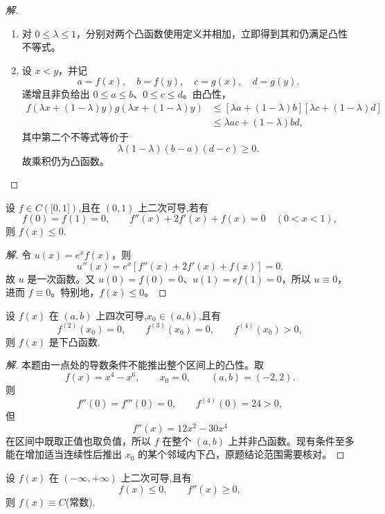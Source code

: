 \documentclass[../../数学分析培优讲义(答案版).tex]{subfiles}
\begin{document}
\begin{proof}[解]
\begin{enumerate}[label=(\arabic*)]
    \item 对 $0\leq\lambda\leq1$，分别对两个凸函数使用定义并相加，立即得到其和仍满足凸性不等式。

    \item 设 $x<y$，并记
    \[
        a=f(x),\quad b=f(y),\quad c=g(x),\quad d=g(y).
    \]
    递增且非负给出 $0\leq a\leq b$、$0\leq c\leq d$。由凸性，
    \[
    \begin{aligned}
        f(\lambda x+(1-\lambda)y)
        g(\lambda x+(1-\lambda)y)
        &\leq[\lambda a+(1-\lambda)b]
        [\lambda c+(1-\lambda)d]\\
        &\leq\lambda ac+(1-\lambda)bd,
    \end{aligned}
    \]
    其中第二个不等式等价于
    \[
        \lambda(1-\lambda)(b-a)(d-c)\geq0.
    \]
    故乘积仍为凸函数。
\end{enumerate}
\end{proof}

\begin{example}
设 $f\in C(\lbrack 0,1\rbrack)$,且在 $(0,1)$ 上二次可导,若有
\[
    f(0)=f(1)=0,
    \qquad f''(x)+2f'(x)+f(x)=0\quad(0<x<1),
\]
则 $f(x)\leq0$.
\end{example}

\begin{proof}[解]
令 $u(x)=e^x f(x)$，则
\[
    u''(x)=e^x[f''(x)+2f'(x)+f(x)]=0.
\]
故 $u$ 是一次函数。又 $u(0)=f(0)=0$、$u(1)=ef(1)=0$，所以 $u\equiv0$，进而 $f\equiv0$。特别地，$f(x)\leq0$。
\end{proof}

\begin{example}
设 $f(x)$ 在 $(a,b)$ 上四次可导,$x_0\in(a,b)$,且有
\[
    f^{(2)}(x_0)=0,
    \qquad f^{(3)}(x_0)=0,
    \qquad f^{(4)}(x_0)>0,
\]
则 $f(x)$ 是下凸函数.
\end{example}

\begin{proof}[解]
本题由一点处的导数条件不能推出整个区间上的凸性。取
\[
    f(x)=x^4-x^6,
    \qquad x_0=0,
    \qquad (a,b)=(-2,2).
\]
则
\[
    f''(0)=f'''(0)=0,
    \qquad f^{(4)}(0)=24>0,
\]
但
\[
    f''(x)=12x^2-30x^4
\]
在区间中既取正值也取负值，所以 $f$ 在整个 $(a,b)$ 上并非凸函数。现有条件至多能在增加适当连续性后推出 $x_0$ 的某个邻域内下凸，原题结论范围需要核对。
\end{proof}

\begin{example}
设 $f(x)$ 在 $(-\infty,+\infty)$ 上二次可导,且有
\[
    f(x)\leq0,
    \qquad f''(x)\geq0,
\]
则 $f(x)\equiv C$(常数).
\end{example}
\end{document}
